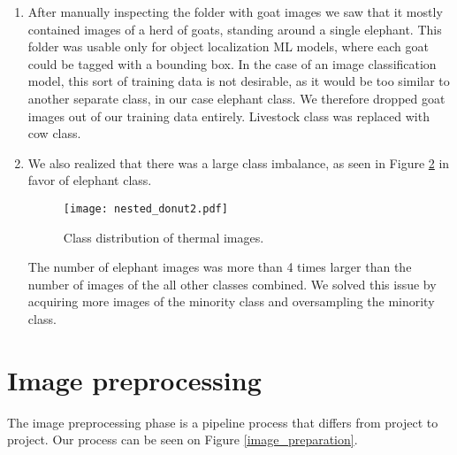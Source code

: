 \begin{enumerate}
\begin{figure}[ht]
    \centering
    \texttt{[image: nested\_donut1.pdf]} 
    \caption{Distribution of used images from thermal dataset depending on image location and type of sensor.}
    \label{nested_donut1}
\end{figure}

We used a total of 13667 images from the thermal image dataset, almost 88 \% of them were made in Whipsnade Zoo, the rest of them were made in Assam.
All images from Assam were made with FLIR Lepton 2.5, while both cameras were used in Whipsnade zoo, however, more photos were made with the 2.5 version of the thermal camera.

    \item After manually inspecting the folder with goat images we saw that it mostly contained images of a herd of goats, standing around a single elephant.
This folder was usable only for object localization ML models, where each goat could be tagged with a bounding box. 
In the case of an image classification model, this sort of training data is not desirable, as it would be too similar to another separate class, in our case elephant class.
We therefore dropped goat images out of our training data entirely.
Livestock class was replaced with cow class.

    \item We also realized that there was a large class imbalance, as seen in Figure \ref{nested_donut2} in favor of elephant class.

\begin{figure}[ht]
    \centering
    \texttt{[image: nested\_donut2.pdf]} 
    \caption{Class distribution of thermal images.}
    \label{nested_donut2}
\end{figure}

The number of elephant images was more than 4 times larger than the number of images of the all other classes combined.
We solved this issue by acquiring more images of the minority class and oversampling the minority class.
\end{enumerate}


\section{ Image preprocessing}

The image preprocessing phase is a pipeline process that differs from project to project.
Our process can be seen on Figure \ref{image_preparation}.

